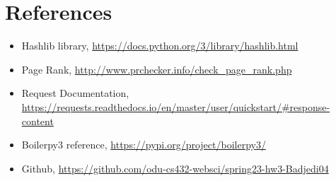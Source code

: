 \documentclass[12pt]{article}
\begin{document}
\clearpage


\section*{References}



\begin{itemize}
    \item {Hashlib library, \url{https://docs.python.org/3/library/hashlib.html}}
    \item {Page Rank, \url{http://www.prchecker.info/check_page_rank.php}}
    \item {Request Documentation, \url{https://requests.readthedocs.io/en/master/user/quickstart/#response-content}}
    \item {Boilerpy3 reference, \url{https://pypi.org/project/boilerpy3/	}}
    \item {Github, \url{https://github.com/odu-cs432-websci/spring23-hw3-Badjedi04}}

\end{itemize}
\end{document}
